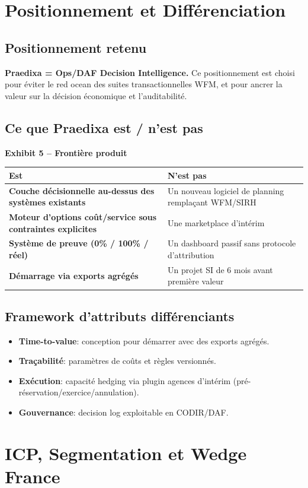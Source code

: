 \documentclass[11pt,a4paper]{article}
\newcommand{\exhibit}[1]{\vspace{2mm}\noindent\colorbox{PraedixaLight}{\parbox{\dimexpr\linewidth-2\fboxsep\relax}{\textbf{#1}}}\vspace{1mm}}
\begin{document}
\section{Positionnement et Différenciation}
\subsection{Positionnement retenu}
\textbf{Praedixa = Ops/DAF Decision Intelligence.} Ce positionnement est choisi pour éviter le \og red ocean \fg{} des suites transactionnelles WFM, et pour ancrer la valeur sur la décision économique et l'auditabilité.

\subsection{Ce que Praedixa est / n'est pas}
\exhibit{Exhibit 5 -- Frontière produit}
\begin{tabularx}{\linewidth}{@{}>{\bfseries}l X@{}}
\toprule
Est & N'est pas \\
\midrule
Couche décisionnelle au-dessus des systèmes existants & Un nouveau logiciel de planning remplaçant WFM/SIRH \\
Moteur d'options coût/service sous contraintes explicites & Une marketplace d'intérim \\
Système de preuve (0\% / 100\% / réel) & Un dashboard passif sans protocole d'attribution \\
Démarrage via exports agrégés & Un projet SI de 6 mois avant première valeur \\
\bottomrule
\end{tabularx}

\subsection{Framework d'attributs différenciants}
\begin{itemize}
  \item \textbf{Time-to-value}: conception pour démarrer avec des exports agrégés.
  \item \textbf{Traçabilité}: paramètres de coûts et règles versionnés.
  \item \textbf{Exécution}: capacité hedging via plugin agences d'intérim (pré-réservation/exercice/annulation).
  \item \textbf{Gouvernance}: decision log exploitable en CODIR/DAF.
\end{itemize}

\section{ICP, Segmentation et Wedge France}
\end{document}
